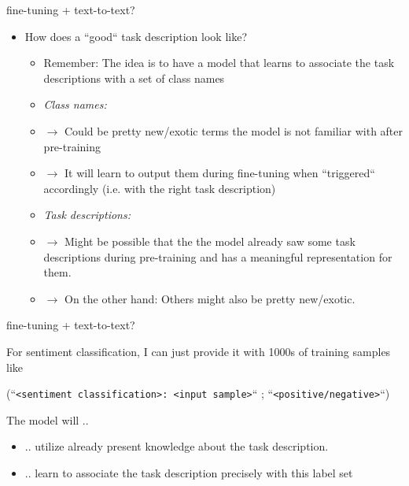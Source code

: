 \begin{frame}{fine-tuning + text-to-text?}

\vfill

\begin{itemize}
	\item \ques How does a ``good`` task description look like?
			\begin{itemize}
				\item Remember: The idea is to have a model that learns to associate the task descriptions with a set of class names
				\item \textit{Class names:} 
				\item[] $\to$ Could be pretty new/exotic terms the model is not familiar with after pre-training
				\item[] $\to$ It will learn to output them during fine-tuning when ``triggered`` accordingly (i.e. with the right task description)
				\item \textit{Task descriptions:} 
				\item[] $\to$ Might be possible that the the model already saw some task descriptions during pre-training and has a meaningful representation for them.
				\item[] $\to$ On the other hand: Others might also be pretty new/exotic.
			\end{itemize}
\end{itemize}

\vfill

\end{frame}


\begin{frame}{fine-tuning + text-to-text?}

\vfill

For sentiment classification, I can just provide it with 1000s of training samples like 

		\begin{center}
				{\small
					(``\texttt{<sentiment classification>: <input sample>}`` ; ``\texttt{<positive/negative>}``)
				}
		\end{center}
		
The model will ..

\begin{itemize}
	\item .. utilize already present knowledge about the task description.
	\item .. learn to associate the task description precisely with this label set
\end{itemize}

\vfill

\end{frame}

